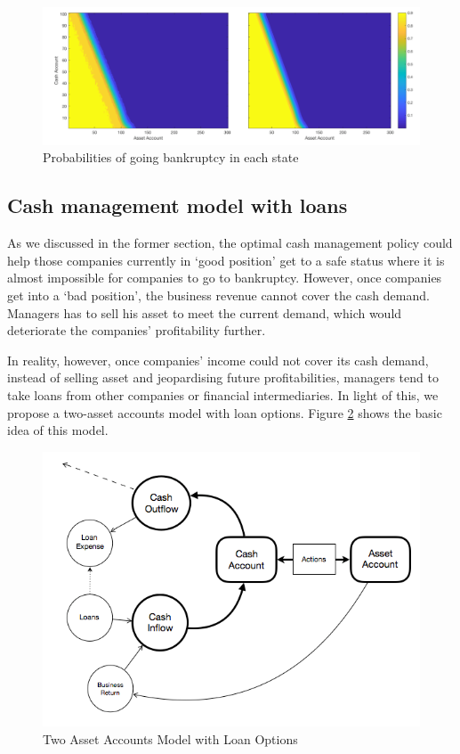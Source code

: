 \documentclass[12pt]{article}
\begin{document}
\begin{figure}
\begin{center}
\includegraphics[scale=.40]{prob}
\end{center}
\caption{Probabilities of going bankruptcy in each state}
\label{prob}
\end{figure}




\subsection{Cash management model with loans}
As we discussed in the former section, the optimal cash management policy could help those companies currently in `good position' get to a safe status where it is almost impossible for companies to go to bankruptcy. However, once companies get into a `bad position', the business revenue cannot cover the cash demand. Managers has to sell his asset to meet the current demand, which would deteriorate the companies' profitability further. 

In reality, however, once companies' income could not cover its cash demand, instead of selling asset and jeopardising future profitabilities, managers tend to take loans from other companies or financial intermediaries. In light of this, we propose a two-asset accounts model with loan options. Figure \ref{loan} shows the basic idea of this model. 

\begin{figure}
\begin{center}
\includegraphics[scale=.43]{loan}
\end{center}
\caption{Two Asset Accounts Model with Loan Options}
\label{loan}
\end{figure}
\end{document}
